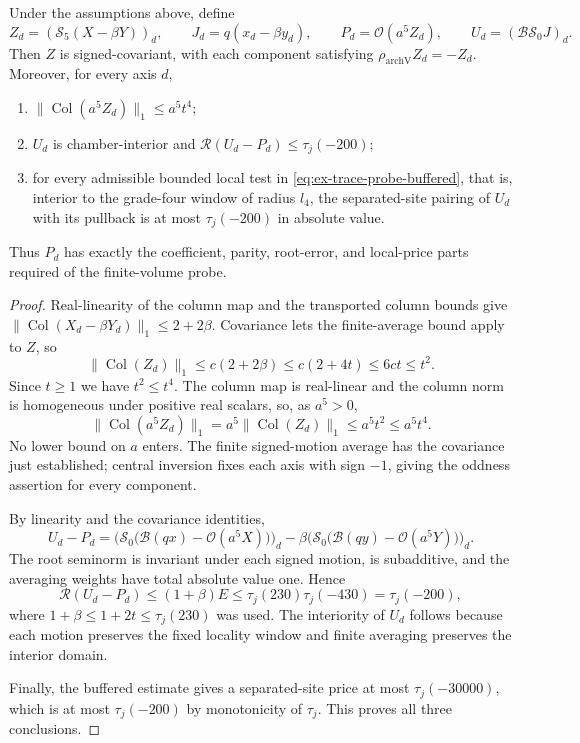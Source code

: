 \begin{proposition}
\label{prop:ex-trace-probe-assembly}
Under the assumptions above, define
\[
 Z_d=(\mathscr S_5(X-\beta Y))_d,\qquad
 J_d=q(x_d-\beta y_d),\qquad
 P_d=\mathcal O(a^5 Z_d),\qquad
 U_d=(\mathcal B\mathscr S_0J)_d.
\]
Then $Z$ is signed-covariant, with each component satisfying
$\rho_{\mathrm{archV}}Z_d=-Z_d$. Moreover, for every axis $d$,
\begin{enumerate}
\item $\|\operatorname{Col}(a^5 Z_d)\|_1\leq a^5t^4$;
\item $U_d$ is chamber-interior and
  $\mathcal R(U_d-P_d)\leq\tau_j(-200)$;
\item for every admissible bounded local test in
  \eqref{eq:ex-trace-probe-buffered}, that is, interior to the grade-four
  window of radius $l_4$, the separated-site pairing of $U_d$
  with its pullback is at most $\tau_j(-200)$ in absolute value.
\end{enumerate}
Thus $P_d$ has exactly the coefficient, parity, root-error, and local-price
parts required of the finite-volume probe.
\end{proposition}
\begin{proof}
Real-linearity of the column map and the transported column bounds give
$\|\operatorname{Col}(X_d-\beta Y_d)\|_1\leq2+2\beta$. Covariance
lets the finite-average bound apply to $Z$, so
\[
 \|\operatorname{Col}(Z_d)\|_1
   \leq c(2+2\beta)\leq c(2+4t)\leq6ct\leq t^2.
\]
Since $t\geq1$ we have $t^2\leq t^4$. The column map is real-linear and
the column norm is homogeneous under positive real scalars, so, as
$a^5>0$,
\[
 \|\operatorname{Col}(a^5Z_d)\|_1=a^5\|\operatorname{Col}(Z_d)\|_1
   \leq a^5t^2\leq a^5t^4.
\]
No lower bound on $a$ enters. The finite signed-motion average has the covariance just established;
central inversion fixes each axis with sign $-1$, giving the oddness
assertion for every component.

By linearity and the covariance identities,
\[
 U_d-P_d=\bigl(\mathscr S_0\bigl(\mathcal B(qx)-\mathcal O(a^5X)\bigr)\bigr)_d
       -\beta\bigl(\mathscr S_0\bigl(\mathcal B(qy)-\mathcal O(a^5Y)\bigr)\bigr)_d.
\]
The root seminorm is invariant under each signed motion, is subadditive,
and the averaging weights have total absolute value one. Hence
\[
 \mathcal R(U_d-P_d)\leq(1+\beta)E
   \leq\tau_j(230)\tau_j(-430)=\tau_j(-200),
\]
where $1+\beta\leq1+2t\leq\tau_j(230)$ was used. The interiority of $U_d$
follows because each motion preserves the fixed locality window and finite
averaging preserves the interior domain.

Finally, the buffered estimate gives a separated-site price at most
$\tau_j(-30000)$, which is at most $\tau_j(-200)$ by monotonicity of
$\tau_j$. This proves all three conclusions.
\end{proof}

